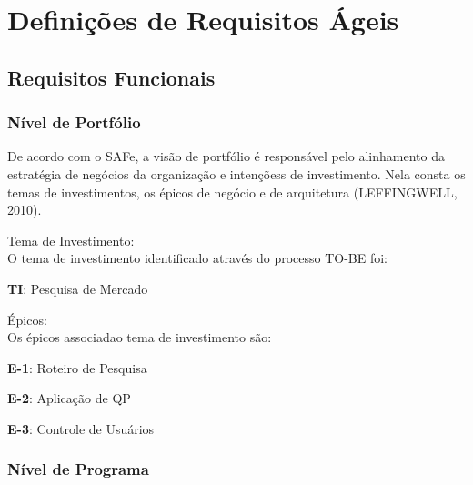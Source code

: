 \section{Definições de Requisitos Ágeis}
	
	\subsection{Requisitos Funcionais}

		\subsubsection{Nível de Portfólio}

			De acordo com o SAFe, a visão de portfólio é responsável pelo alinhamento da estratégia de negócios da organização e intençõess de investimento. Nela consta os temas de investimentos, os épicos de negócio e de arquitetura (LEFFINGWELL, 2010). 

			\begin{itemize}
			{
				\item Tema de Investimento:\\
				O tema de investimento identificado através do processo TO-BE foi:
				\begin{itemize}
				{
					\item \textbf{TI}: Pesquisa de Mercado\\
				}
				\end{itemize}

				\item Épicos:\\
				Os épicos associadao tema de investimento são:
				\begin{itemize}
				{
					\item \textbf{E-1}: Roteiro de Pesquisa\\

					\item \textbf{E-2}: Aplicação de QP\\

					\item \textbf{E-3}: Controle de Usuários\\
				}
				\end{itemize}
			}
			\end{itemize}


		\subsubsection{Nível de Programa}

